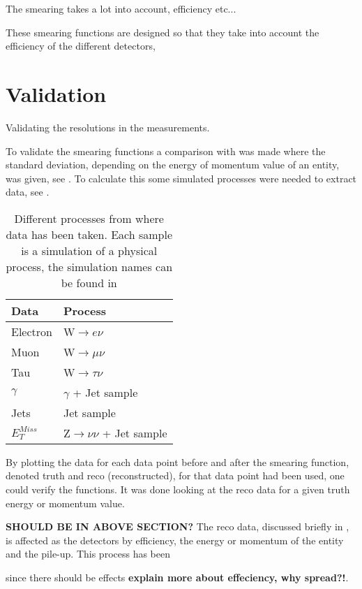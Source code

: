 The smearing takes a lot into account, efficiency etc...


These smearing functions are designed so that they take into account the efficiency of the different detectors, 


\section{Validation}\label{sec:vali}
Validating the resolutions in the measurements.  


To validate the smearing functions a comparison with \citep{ATL-PHYS-PUB-2013-004} was made where the standard deviation, depending on the energy of momentum value of an entity, was given, see . To calculate this some simulated processes were needed to extract data, see . 
\begin{SCtable}[][ht]
\begin{tabular}{|l|l|}
\hline
Data & Process \\ \hline
Electron & W$\rightarrow e\nu$ \\
Muon & W$\rightarrow \mu \nu$ \\
Tau & W$\rightarrow \tau \nu$ \\
$\gamma$ & $\gamma$ + Jet sample \\
Jets & Jet sample \\
$E_T^{Miss}$ & Z$\rightarrow \nu \nu$ + Jet sample \\ \hline
\end{tabular}
\caption{Different processes from where data has been taken. Each sample is a simulation of a physical process, the simulation names can be found in }
\label{tab:backproc}
\end{SCtable}


By plotting the data for each data point before and after the smearing function, denoted truth and reco (reconstructed), for that data point had been used, one could verify the functions. It was done looking at the reco data for a given truth energy or momentum value. 

\textbf{SHOULD BE IN ABOVE SECTION?}
The reco data, discussed briefly in , is affected as the detectors by efficiency, the energy or momentum of the entity and the pile-up. This process has been 

 since there should be effects \textbf{explain more about effeciency, why spread?!}. 

